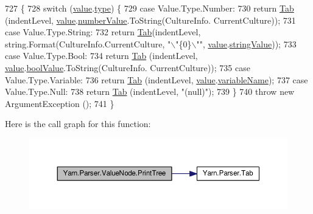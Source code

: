 \begin{DoxyCode}
727             \{
728                 \textcolor{keywordflow}{switch} (\hyperlink{a00188_a51ab5939344f9bfa21181c02cf0e341d}{value}.\hyperlink{a00187_a6d5820fafa766911b9da84d1ed33e51a}{type}) \{
729                 \textcolor{keywordflow}{case} Value.Type.Number:
730                     \textcolor{keywordflow}{return} \hyperlink{a00149_aa8fa36b46de12a1c561d77b99c4b9ae3}{Tab} (indentLevel, \hyperlink{a00188_a51ab5939344f9bfa21181c02cf0e341d}{value}.\hyperlink{a00187_ae1892c1c7a8177537d1caa39a2e51da6}{numberValue}.ToString(CultureInfo.
      CurrentCulture));
731                 \textcolor{keywordflow}{case} Value.Type.String:
732                     \textcolor{keywordflow}{return} \hyperlink{a00149_aa8fa36b46de12a1c561d77b99c4b9ae3}{Tab}(indentLevel, \textcolor{keywordtype}{string}.Format(CultureInfo.CurrentCulture, \textcolor{stringliteral}{"\(\backslash\)"\{0\}\(\backslash\)""}, 
      \hyperlink{a00188_a51ab5939344f9bfa21181c02cf0e341d}{value}.\hyperlink{a00187_add1b07146f1a9e4b655b33c93d07dff9}{stringValue}));
733                 \textcolor{keywordflow}{case} Value.Type.Bool:
734                     \textcolor{keywordflow}{return} \hyperlink{a00149_aa8fa36b46de12a1c561d77b99c4b9ae3}{Tab} (indentLevel, \hyperlink{a00188_a51ab5939344f9bfa21181c02cf0e341d}{value}.\hyperlink{a00187_acb140e3466e132528409d4c441fd67da}{boolValue}.ToString(CultureInfo.
      CurrentCulture));
735                 \textcolor{keywordflow}{case} Value.Type.Variable:
736                     \textcolor{keywordflow}{return} \hyperlink{a00149_aa8fa36b46de12a1c561d77b99c4b9ae3}{Tab} (indentLevel, \hyperlink{a00188_a51ab5939344f9bfa21181c02cf0e341d}{value}.\hyperlink{a00187_a8ee2b09b7d28eaf97bf63c74d0023bfd}{variableName});
737                 \textcolor{keywordflow}{case} Value.Type.Null:
738                     \textcolor{keywordflow}{return} \hyperlink{a00149_aa8fa36b46de12a1c561d77b99c4b9ae3}{Tab} (indentLevel, \textcolor{stringliteral}{"(null)"});
739                 \}
740                 \textcolor{keywordflow}{throw} \textcolor{keyword}{new} ArgumentException ();
741             \}
\end{DoxyCode}


Here is the call graph for this function\-:
\nopagebreak
\begin{figure}[H]
\begin{center}
\leavevmode
\includegraphics[width=350pt]{a00188_ae4659e4431e9846a45e0d048c960781a_cgraph}
\end{center}
\end{figure}


